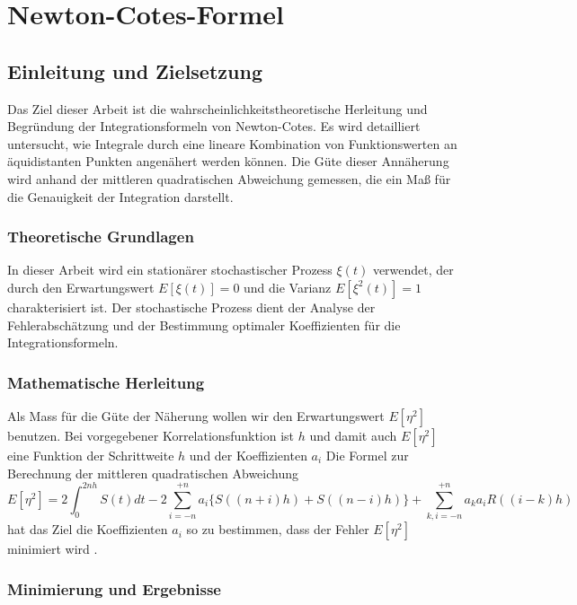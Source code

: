 \chapter{Newton-Cotes-Formel}



\section{Einleitung und Zielsetzung}

Das Ziel dieser Arbeit ist die wahrscheinlichkeitstheoretische Herleitung und Begründung der Integrationsformeln von Newton-Cotes. Es wird detailliert untersucht, wie Integrale durch eine lineare Kombination von Funktionswerten an äquidistanten Punkten angenähert werden können. Die Güte dieser Annäherung wird anhand der mittleren quadratischen Abweichung gemessen, die ein Maß für die Genauigkeit der Integration darstellt.

\subsection{Theoretische Grundlagen}

In dieser Arbeit wird ein stationärer stochastischer Prozess $\xi(t)$ verwendet, der durch den Erwartungswert $E[\xi(t)] = 0$ und die Varianz $E[\xi^2(t)] = 1$ charakterisiert ist. Der stochastische Prozess dient der Analyse der Fehlerabschätzung und der Bestimmung optimaler Koeffizienten für die Integrationsformeln\textsc{\cite[S. 190]{Newton-Cotes-Formeln}}.

\subsection{Mathematische Herleitung}

Als Mass für die Güte der Näherung wollen wir den Erwartungswert $E[\eta^2]$
benutzen. Bei vorgegebener Korrelationsfunktion ist $h$ und damit auch $E[\eta^2]$
eine Funktion der Schrittweite $h$ und der Koeffizienten $a_i$ Die Formel zur Berechnung der mittleren quadratischen Abweichung
\[
E[\eta^2] = 2 \int_0^{2nh} S(t) dt - 2 \sum_{i = -n}^{+n} a_i \{ S((n + i)h) + S((n-i)h) \} + \sum_{k,i = -n}^{+n} a_k a_i R((i-k)h)
\]
hat das Ziel die Koeffizienten $a_i$ so zu bestimmen, dass der Fehler $E[\eta^2]$ minimiert wird \textsc{\cite[S. 191] {Newton-Cotes-Formeln}}.

\subsection{Minimierung und Ergebnisse}

